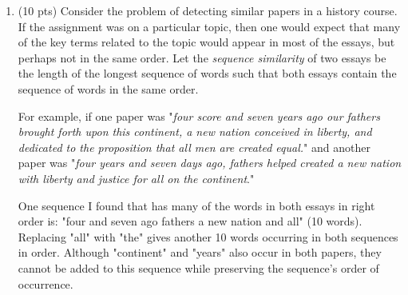 \documentclass[11pt]{article}
\newtheorem*{solution}{Solution}
\begin{document}
\begin{enumerate}
\begin{enumerate}
\item (2 pts) Derive a recurrence for $C(k)$
in terms of $C(j)$ values where $j<k$.
\begin{solution}

\end{solution}
\newpage

\item (4 pts) 
Give a bottom-up iterative algorithm for computing the
$C(j)$ values.  
This algorithm may also compute ``signpost'' values for use in the following part.

For part (c), it may be helpful to first construct a recursive algorithm for
computing the $C(k)$ values.
\begin{solution}

\end{solution}
\newpage

\item(1 pt) 
Finally, show how keeping a little (i.e.~$O(n)$) additional information allows the
a cheapest sequence of canoe rentals to be printed out in $O(n)$ time.
\begin{solution}

\end{solution}
\newpage
\end{enumerate}



\item (10 pts) 
Consider the problem of detecting similar papers in a history course. 
If the assignment was on a particular topic, then one would expect that many of the key terms related to the topic would appear in most of the essays, but perhaps not in the same order.
Let the \emph{sequence similarity} of two essays be the length of the longest sequence of words such that both essays contain the sequence of words in the same order.

For example, if one paper was "\emph{four score and seven years ago our fathers brought forth upon this continent, a new nation conceived in liberty, and dedicated to the proposition that all men are created equal.}"  and another paper was "\emph{four years and seven days ago, fathers helped created a new nation with liberty and justice for all on the continent}."

One sequence I found that has many of the words in both essays in right order is:
"four and seven ago fathers a new nation and all" (10 words).  Replacing "all" with "the" gives another 10 words occurring in both sequences in order.
Although "continent" and "years" also occur in both papers, they cannot be added to this sequence while preserving the sequence's order of occurrence. 


\end{enumerate}
\end{document}
